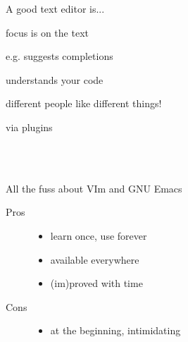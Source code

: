 \documentclass[10pt]{beamer}
\begin{document}
\begin{frame}{A good text editor is...}

  \begin{description}[<+->]
  \item [Invisible!] focus is on the text
  \item [Helpful] e.g. suggests completions
  \item [Smart] understands your code
  \item [Yours!] different people like different things!
  \item [Extensible] via plugins
  \end{description}

  \\~\\


\end{frame}

\begin{frame}{All the fuss about VIm and GNU Emacs}
\Large
  \begin{description}
  \item[Pros]
    \begin{itemize}
    \item learn once, use forever
    \item available everywhere
    \item (im)proved with time
    \end{itemize}
  \item[Cons]
    \begin{itemize}
    \item at the beginning, intimidating
    \end{itemize}
  \end{description}
\end{frame}
\end{document}
